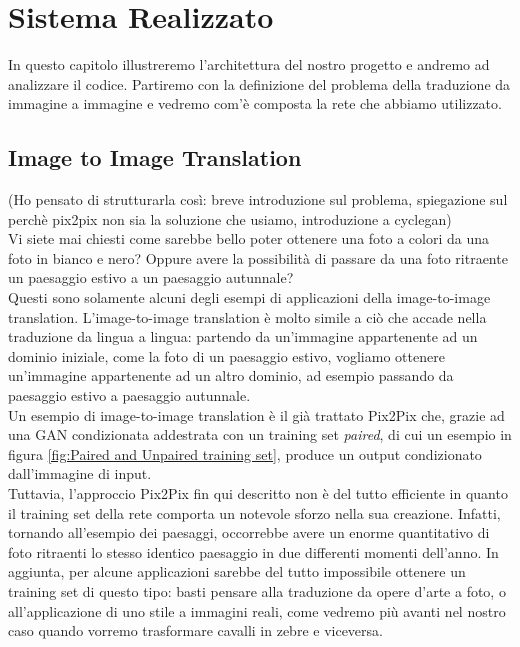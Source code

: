 \chapter{Sistema Realizzato}
In questo capitolo illustreremo l'architettura del nostro progetto e andremo ad analizzare il codice. Partiremo con la definizione del problema della traduzione da immagine a immagine e vedremo com'è composta la rete che abbiamo utilizzato.

\section{Image to Image Translation}
(Ho pensato di strutturarla così: breve introduzione sul problema, spiegazione sul perchè pix2pix non sia la soluzione che usiamo, introduzione a cyclegan)\\
Vi siete mai chiesti come sarebbe bello poter ottenere una foto a colori da una foto in bianco e nero? Oppure avere la possibilità di passare da una foto ritraente un paesaggio estivo a un paesaggio autunnale?
\\Questi sono solamente alcuni degli esempi di applicazioni della image-to-image translation. L'image-to-image translation è molto simile a ciò che accade nella traduzione da lingua a lingua: partendo da un'immagine appartenente ad un dominio iniziale, come la foto di un paesaggio estivo, vogliamo ottenere un'immagine appartenente ad un altro dominio, ad esempio passando da paesaggio estivo a paesaggio autunnale.
\\Un esempio di image-to-image translation è il già trattato Pix2Pix \cite{isola2018imagetoimage} che, grazie ad una GAN condizionata addestrata con un training set \emph{paired}, di cui un esempio in figura \ref{fig:Paired and Unpaired training set}, produce un output condizionato dall'immagine di input.
\\Tuttavia, l'approccio Pix2Pix fin qui descritto non è del tutto efficiente in quanto il training set della rete comporta un notevole sforzo nella sua creazione. Infatti, tornando all'esempio dei paesaggi, occorrebbe avere un enorme quantitativo di foto ritraenti lo stesso identico paesaggio in due differenti momenti dell'anno. In aggiunta, per alcune applicazioni sarebbe del tutto impossibile ottenere un training set di questo tipo: basti pensare alla traduzione da opere d'arte a foto, o all'applicazione di uno stile a immagini reali, come vedremo più avanti nel nostro caso quando vorremo trasformare cavalli in zebre e viceversa.

